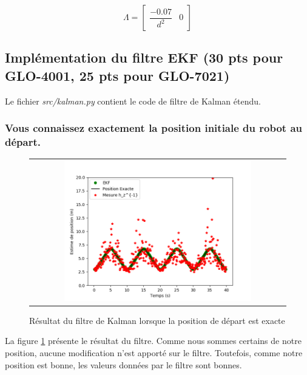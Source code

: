 \documentclass[12pt]{article}
\begin{document}
\begin{equation}
\Lambda =
\begin{bmatrix}
    \dfrac{-0.07}{d^2} & 0
\end{bmatrix}
\end{equation}

\subsection{Implémentation du filtre EKF (30 pts pour GLO-4001, 25 pts pour GLO-7021)}

Le fichier \textit{src/kalman.py} contient le code de filtre de Kalman étendu.

\subsubsection{Vous connaissez exactement la position initiale du robot au départ.}

\begin{figure}[ht]
 \begin{center}
  \begin{tabular}{c}
    \includegraphics[width=0.75\textwidth]{fig/kalman-position-exacte.png}
  \end{tabular}
 \end{center}
\vspace{-0.25in}
 \caption{Résultat du filtre de Kalman lorsque la position de départ est exacte}
    \label{kalman-position-exacte}
\end{figure}

La figure \ref{kalman-position-exacte} présente le résultat du filtre.
Comme nous sommes certains de notre position, aucune modification n'est apporté sur le filtre.
Toutefois, comme notre position est bonne, les valeurs données par le filtre sont bonnes.
\end{document}
